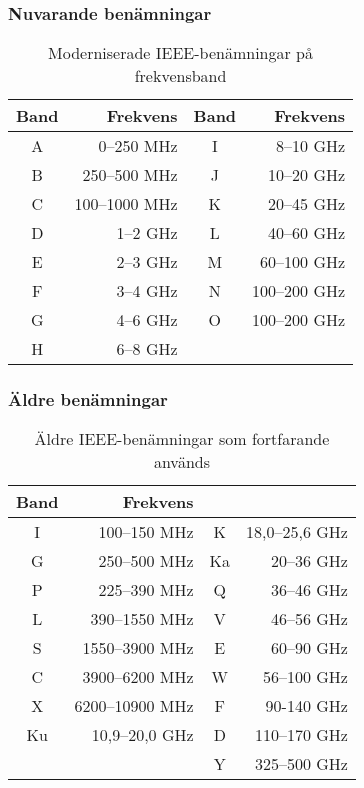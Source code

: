 \subsubsection{Nuvarande benämningar}

\begin{table}[H]
	\centering
	\begin{tabular}{cr|cr}
		\textbf{Band} & \textbf{Frekvens} & \bf Band & \bf Frekvens \\ \hline
		      A       &        0--250 MHz &    I     &    8--10 GHz \\
		      B       &      250--500 MHz &    J     &   10--20 GHz \\
		      C       &     100--1000 MHz &    K     &   20--45 GHz \\
		      D       &          1--2 GHz &    L     &   40--60 GHz \\
		      E       &          2--3 GHz &    M     &  60--100 GHz \\
		      F       &          3--4 GHz &    N     & 100--200 GHz \\
		      G       &          4--6 GHz &    O     & 100--200 GHz \\
		      H       &          6--8 GHz &          &
	\end{tabular}
	\caption{Moderniserade IEEE-benämningar på frekvensband}
\end{table}

\subsubsection{Äldre benämningar}

\begin{table}[H]
	\centering
	\begin{tabular}{cr|cr}
		\textbf{Band} & \textbf{Frekvens} &    &                \\ \hline
		      I       &      100--150 MHz & K  & 18,0--25,6 GHz \\
		      G       &      250--500 MHz & Ka &     20--36 GHz \\
		      P       &      225--390 MHz & Q  &     36--46 GHz \\
		      L       &     390--1550 MHz & V  &     46--56 GHz \\
		      S       &    1550--3900 MHz & E  &     60--90 GHz \\
		      C       &    3900--6200 MHz & W  &    56--100 GHz \\
		      X       &   6200--10900 MHz & F  &     90-140 GHz \\
		     Ku       &    10,9--20,0 GHz & D  &   110--170 GHz \\
		              &                   & Y  &   325--500 GHz
	\end{tabular}
	\caption{Äldre IEEE-benämningar som fortfarande används}
\end{table}

